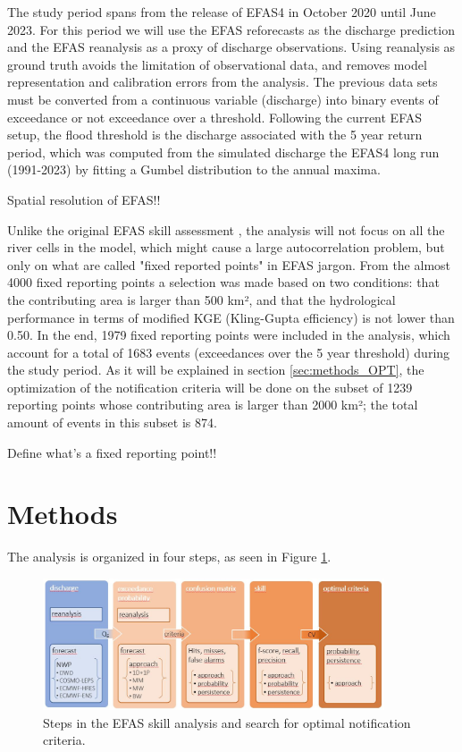 \documentclass[preprint,12pt]{elsarticle}
\begin{document}
The study period spans from the release of EFAS4 in October 2020 until June 2023. For this period we will use the EFAS reforecasts as the discharge prediction and the EFAS reanalysis as a proxy of discharge observations. Using reanalysis as ground truth avoids the limitation of observational data, and removes model representation and calibration errors from the analysis. The previous data sets must be converted from a continuous variable (discharge) into binary events of exceedance or not exceedance over a threshold. Following the current EFAS setup, the flood threshold is the discharge associated with the 5 year return period, which was computed from the simulated discharge the EFAS4 long run (1991-2023)  by fitting a Gumbel distribution to the annual maxima.

Spatial resolution of EFAS!!

Unlike the original EFAS skill assessment \cite{Bartholmes2009}, the analysis will not focus on all the river cells in the model, which might cause a large autocorrelation problem, but only on what are called "fixed reported points" in EFAS jargon. From the almost 4000 fixed reporting points a selection was made based on two conditions: that the contributing area is larger than 500 km², and that the hydrological performance in terms of modified KGE (Kling-Gupta efficiency) \cite{Gupta2009, Knoben2019} is not lower than 0.50. In the end, 1979 fixed reporting points were included in the analysis, which account for a total of 1683 events (exceedances over the 5 year threshold) during the study period. As it will be explained in section \ref{sec:methods_OPT}, the optimization of the notification criteria will be done on the subset of 1239 reporting points whose contributing area is larger than 2000 km²; the total amount of events in this subset is 874.

Define what's a fixed reporting point!!



\section{Methods}
\label{sec:methods}

The analysis is organized in four steps, as seen in Figure \ref{fig:scheme}.

\begin{figure}
    \centering
    \includegraphics[width=0.9\textwidth]{figures/study_layout.JPG}
    \caption{Steps in the EFAS skill analysis and search for optimal notification criteria.}
    \label{fig:scheme}
\end{figure}
\end{document}
